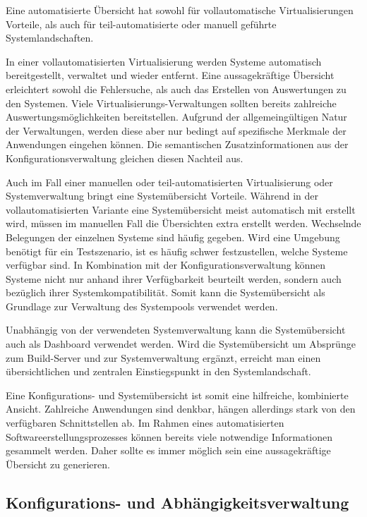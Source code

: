 Eine automatisierte Übersicht hat sowohl für vollautomatische Virtualisierungen Vorteile, als auch für teil-automatisierte oder manuell geführte Systemlandschaften.

In einer vollautomatisierten Virtualisierung werden Systeme automatisch bereitgestellt, verwaltet und wieder entfernt. Eine aussagekräftige Übersicht erleichtert sowohl die Fehlersuche, als auch das Erstellen von Auswertungen zu den Systemen. Viele Virtualisierungs-Verwaltungen sollten bereits zahlreiche Auswertungsmöglichkeiten bereitstellen. Aufgrund der allgemeingültigen Natur der Verwaltungen, werden diese aber nur bedingt auf spezifische Merkmale der Anwendungen eingehen können. Die semantischen Zusatzinformationen aus der Konfigurationsverwaltung gleichen diesen Nachteil aus.

Auch im Fall einer manuellen oder teil-automatisierten Virtualisierung oder Systemverwaltung bringt eine Systemübersicht Vorteile. Während in der vollautomatisierten Variante eine Systemübersicht meist automatisch mit erstellt wird, müssen im manuellen Fall die Übersichten extra erstellt werden. Wechselnde Belegungen der einzelnen Systeme sind häufig gegeben. Wird eine Umgebung benötigt für ein Testszenario, ist es häufig schwer festzustellen, welche Systeme verfügbar sind. In Kombination mit der Konfigurationsverwaltung können Systeme nicht nur anhand ihrer Verfügbarkeit beurteilt werden, sondern auch bezüglich ihrer Systemkompatibilität. Somit kann die Systemübersicht als Grundlage zur Verwaltung des Systempools verwendet werden.

Unabhängig von der verwendeten Systemverwaltung kann die Systemübersicht auch als Dashboard verwendet werden. Wird die Systemübersicht um Absprünge zum Build-Server und zur Systemverwaltung ergänzt, erreicht man einen übersichtlichen und zentralen Einstiegspunkt in den Systemlandschaft.

Eine Konfigurations- und Systemübersicht ist somit eine hilfreiche, kombinierte Ansicht. Zahlreiche Anwendungen sind denkbar, hängen allerdings stark von den verfügbaren Schnittstellen ab. Im Rahmen eines automatisierten Softwareerstellungsprozesses können bereits viele notwendige Informationen gesammelt werden. Daher sollte es immer möglich sein eine aussagekräftige Übersicht zu generieren.

\subsection{Konfigurations- und Abhängigkeitsverwaltung}

